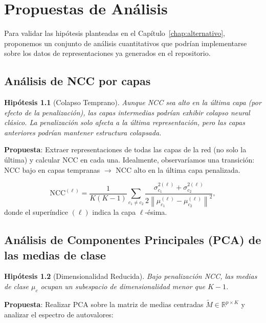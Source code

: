 \documentclass[12pt,a4paper]{report}
\newtheorem{hypothesis}{Hipótesis}[chapter]
\newcommand{\R}{\mathbb{R}}
\newcommand{\norm}[1]{\left\lVert#1\right\rVert}
\newcommand{\NCC}{\text{NCC}}
\begin{document}
\chapter{Propuestas de Análisis}
\label{chap:propuestas}

Para validar las hipótesis planteadas en el Capítulo~\ref{chap:alternativo}, proponemos un conjunto de análisis cuantitativos que podrían implementarse sobre los datos de representaciones ya generados en el repositorio.

\section{Análisis de NCC por capas}

\begin{hypothesis}[Colapso Temprano]
Aunque NCC sea alto en la última capa (por efecto de la penalización), las capas intermedias podrían exhibir colapso neural clásico. La penalización solo afecta a la última representación, pero las capas anteriores podrían mantener estructura colapsada.
\end{hypothesis}

\textbf{Propuesta}: Extraer representaciones de todas las capas de la red (no solo la última) y calcular NCC en cada una. Idealmente, observaríamos una transición: NCC bajo en capas tempranas $\to$ NCC alto en la última capa penalizada.

\begin{equation}
    \NCC^{(\ell)} = \frac{1}{K(K-1)}\sum_{c_1 \neq c_2} \frac{\sigma_{c_1}^{2(\ell)} + \sigma_{c_2}^{2(\ell)}}{2\norm{\mu_{c_1}^{(\ell)} - \mu_{c_2}^{(\ell)}}^2},
\end{equation}
donde el superíndice $(\ell)$ indica la capa $\ell$-ésima.

\section{Análisis de Componentes Principales (PCA) de las medias de clase}

\begin{hypothesis}[Dimensionalidad Reducida]
Bajo penalización NCC, las medias de clase $\mu_c$ ocupan un subespacio de dimensionalidad menor que $K-1$.
\end{hypothesis}

\textbf{Propuesta}: Realizar PCA sobre la matriz de medias centradas $\tilde{M} \in \R^{p \times K}$ y analizar el espectro de autovalores:
\end{document}
